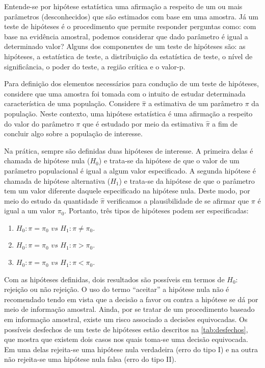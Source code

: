 Entende-se por hipótese estatística uma afirmação a respeito de um ou 
mais parâmetros (desconhecidos) que são estimados com base em uma amostra. Já um teste de hipóteses é o procedimento que permite responder perguntas como: com base na evidência amostral, podemos considerar que dado parâmetro é igual a determinado valor? Alguns dos componentes de um teste de hipóteses são: as hipóteses, a estatística de teste, a distribuição da estatística de teste, o nível de significância, o poder do teste, a região crítica e o valor-p.

Para definição dos elementos necessários para condução de um teste de hipóteses, considere que uma amostra foi tomada com o intuito de estudar determinada característica de uma população. Considere $\hat{\pi}$ a estimativa de um parâmetro $\pi$ da população. Neste contexto, uma hipótese estatística é uma afirmação a respeito do valor do parâmetro $\pi$ que é estudado por meio da estimativa $\hat{\pi}$ a fim de concluir algo sobre a população de interesse.

Na prática, sempre são definidas duas hipóteses de interesse. A primeira 
delas é chamada de hipótese nula ($H_0$) e trata-se da hipótese de que
o valor de um parâmetro populacional é igual a algum valor especificado. A segunda hipótese é chamada de hipótese alternativa ($H_1$) e trata-se da hipótese de que o parâmetro tem um valor diferente daquele especificado na hipótese nula. Deste modo, por meio do estudo da quantidade $\hat{\pi}$ verificamos a plausibilidade de se afirmar que $\pi$ é igual a um valor $\pi_0$. Portanto, três tipos de hipóteses podem ser especificadas:

\begin{enumerate}

  \item $H_0: \pi = \pi_0 \, \, vs \, \, H_1: \pi \neq \pi_0$.
  
  \item $H_0: \pi = \pi_0 \, \, vs \, \, H_1: \pi >  \pi_0$.
  
  \item $H_0: \pi = \pi_0 \, \, vs \, \, H_1: \pi < \pi_0$.
  
\end{enumerate}

Com as hipóteses definidas, dois resultados são possíveis em termos de $H_0$: rejeição ou não rejeição. O uso do termo ``aceitar'' a hipótese nula não é recomendado tendo em vista que a decisão a favor ou contra a hipótese se dá por meio de informação amostral. Ainda, por se tratar de um procedimento baseado em informação amostral, existe um risco associado a decisões equivocadas. Os possíveis desfechos de um teste de hipóteses estão descritos na \autoref{tab:desfechos}, que mostra que existem dois casos nos quais toma-se uma decisão equivocada. Em uma delas rejeita-se uma hipótese nula  verdadeira (erro do tipo I) e na outra não rejeita-se uma hipótese nula falsa (erro do tipo II). 

